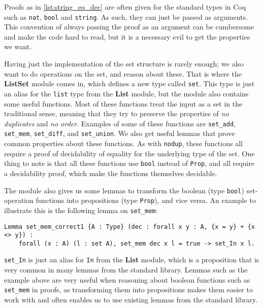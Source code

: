 Proofs as in \autoref{lst:string_eq_dec} are often given for the standard types in Coq such as \lstinline{nat},
\lstinline{bool} and \lstinline{string}.
As such, they can just be passed as arguments.
This convention of always passing the proof as an argument can be cumbersome and make the code hard to read,
but it is a necessary evil to get the properties we want.

Having just the implementation of the set structure is rarely enough; we also want to do operations on the set, and reason about these.
That is where the \textbf{ListSet} module comes in, which defines a new type called \lstinline{set}.
This type is just an alias for the \lstinline{list} type from the \textbf{List} module,
but the module also contains some useful functions.
Most of these functions treat the input as a set in the traditional sense,
meaning that they try to preserve the properties of \textit{no duplicates} and \textit{no order}.
Examples of some of these functions are \lstinline{set_add}, \lstinline{set_mem},
\lstinline{set_diff}, and \lstinline{set_union}.
We also get useful lemmas that prove common properties about these functions.
As with \lstinline{nodup}, these functions all require a proof of decidability of equality for the underlying type of the set.
One thing to note is that all these functions use \lstinline{bool} instead of
\lstinline{Prop}, and all require a decidability proof, which make the functions themselves decidable.

The module also gives us some lemmas to transform the boolean (type \lstinline{bool}) set-operation functions into
propositions (type \lstinline{Prop}), and vice versa. An example to illustrate this is the following lemma on \lstinline{set_mem}:

\begin{minipage}{\linewidth}
\begin{lstlisting}[language=Coq, label={lst:set_mem_correct1}, caption={\lstinline{set_mem} lemma from \lstinline{ListSet}}]
Lemma set_mem_correct1 {A : Type} (dec : forall x y : A, {x = y} + {x <> y}) :
    forall (x : A) (l : set A), set_mem dec x l = true -> set_In x l.
\end{lstlisting}
\end{minipage}

\lstinline{set_In} is just an alias for \lstinline{In} from the \textbf{List} module,
which is a proposition that is very common in many lemmas from the standard library.
Lemmas such as the example above are very useful when reasoning about boolean functions such as
\lstinline{set_mem} in proofs, as transforming them into propositions makes them easier to work with
and often enables us to use existing lemmas from the standard library.

